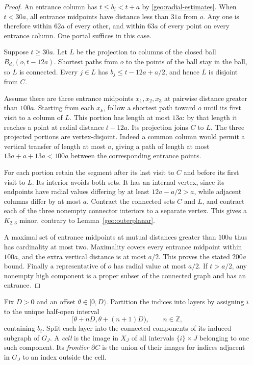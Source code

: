 \begin{proof}
An entrance column has $t\le b_i<t+a$ by
\eqref{geo:radial-estimates}.  When $t<30a$, all entrance midpoints have
distance less than $31a$ from $o$.  Any one is therefore within $62a$ of
every other, and within $63a$ of every point on every entrance column.
One portal suffices in this case.

Suppose $t\ge30a$.  Let $L$ be the projection to columns of the closed
ball $B_{d_J}(o,t-12a)$.  Shortest paths from $o$ to the points
of the ball stay in the ball, so $L$ is connected.  Every $j\in L$ has
$b_j\le t-12a+a/2$, and hence $L$ is disjoint from $C$.

Assume there are three entrance midpoints $x_1,x_2,x_3$ at pairwise
distance greater than $100a$.  Starting from each $x_k$, follow a shortest
path toward $o$ until its first visit to a column of $L$.  This portion
has length at most $13a$: by that length it reaches a point at radial
distance $t-12a$.  Its projection joins $C$ to $L$.  The three projected
portions are vertex-disjoint.  Indeed a common column would permit a
vertical transfer of length at most $a$, giving a path of length at most
$13a+a+13a<100a$ between the corresponding entrance points.

For each portion retain the segment after its last visit to $C$ and
before its first visit to $L$.  Its interior avoids both sets.  It has
an internal vertex, since its endpoints have radial values differing by
at least $12a-a/2>a$, while adjacent columns differ by at most $a$.
Contract the connected sets $C$ and $L$, and contract each of the three
nonempty connector interiors to a separate vertex.  This gives a
$K_{2,3}$ minor, contrary to Lemma~\ref{geo:outerplanar}.

A maximal set of entrance midpoints at mutual distances greater than
$100a$ thus has cardinality at most two.  Maximality covers every entrance
midpoint within $100a$, and the extra vertical distance is at most $a/2$.
This proves the stated $200a$ bound.  Finally a representative of $o$ has
radial value at most $a/2$.  If $t>a/2$, any nonempty high component is a
proper subset of the connected graph and has an entrance.
\end{proof}



\begin{definition}\label{geo:cell-definition}
Fix $D>0$ and an offset $\theta\in[0,D)$.  Partition the indices into
layers by assigning $i$ to the unique half-open interval
\[
 [\theta+nD,\theta+(n+1)D),\qquad n\in\mathbb Z,
\]
containing $b_i$.  Split each layer into the connected components of its
induced subgraph of $G_J$.  A \emph{cell} is the image in $X_J$ of all
intervals $\{i\}\times J$ belonging to one such component. Its
\emph{frontier} $\partial C$ is the union of their images for indices
adjacent in $G_J$ to an index outside the cell.
\end{definition}

